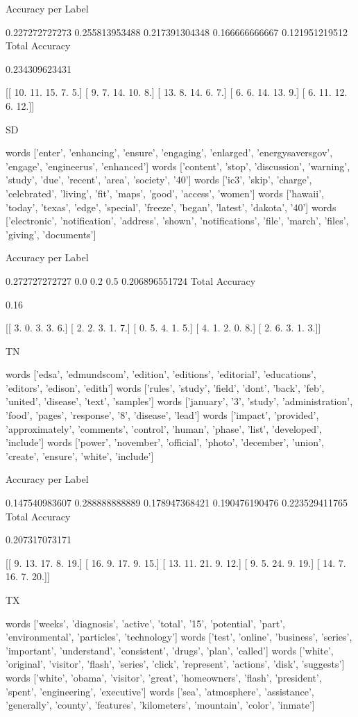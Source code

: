 \documentclass[11pt]{article}
\begin{document}
\begin{verbatium}
Accuracy per Label

0.227272727273
0.255813953488
0.217391304348
0.166666666667
0.121951219512
Total Accuracy

0.234309623431


[[ 10.  11.  15.   7.   5.]
 [  9.   7.  14.  10.   8.]
 [ 13.   8.  14.   6.   7.]
 [  6.   6.  14.  13.   9.]
 [  6.  11.  12.   6.  12.]]


SD


words
['enter', 'enhancing', 'ensure', 'engaging', 'enlarged', 'energysaversgov', 'engage', 'engineerus', 'enhanced']
words
['content', 'stop', 'discussion', 'warning', 'study', 'due', 'recent', 'area', 'society', '40']
words
['ic3', 'skip', 'charge', 'celebrated', 'living', 'fit', 'maps', 'good', 'access', 'women']
words
['hawaii', 'today', 'texas', 'edge', 'special', 'freeze', 'began', 'latest', 'dakota', '40']
words
['electronic', 'notification', 'address', 'shown', 'notifications', 'file', 'march', 'files', 'giving', 'documents']

Accuracy per Label

0.272727272727
0.0
0.2
0.5
0.206896551724
Total Accuracy

0.16


[[ 3.  0.  3.  3.  6.]
 [ 2.  2.  3.  1.  7.]
 [ 0.  5.  4.  1.  5.]
 [ 4.  1.  2.  0.  8.]
 [ 2.  6.  3.  1.  3.]]


TN


words
['edsa', 'edmundscom', 'edition', 'editions', 'editorial', 'educations', 'editors', 'edison', 'edith']
words
['rules', 'study', 'field', 'dont', 'back', 'feb', 'united', 'disease', 'text', 'samples']
words
['january', '3', 'study', 'administration', 'food', 'pages', 'response', '8', 'disease', 'lead']
words
['impact', 'provided', 'approximately', 'comments', 'control', 'human', 'phase', 'list', 'developed', 'include']
words
['power', 'november', 'official', 'photo', 'december', 'union', 'create', 'ensure', 'white', 'include']

Accuracy per Label

0.147540983607
0.288888888889
0.178947368421
0.190476190476
0.223529411765
Total Accuracy

0.207317073171


[[  9.  13.  17.   8.  19.]
 [ 16.   9.  17.   9.  15.]
 [ 13.  11.  21.   9.  12.]
 [  9.   5.  24.   9.  19.]
 [ 14.   7.  16.   7.  20.]]


TX


words
['weeks', 'diagnosis', 'active', 'total', '15', 'potential', 'part', 'environmental', 'particles', 'technology']
words
['test', 'online', 'business', 'series', 'important', 'understand', 'consistent', 'drugs', 'plan', 'called']
words
['white', 'original', 'visitor', 'flash', 'series', 'click', 'represent', 'actions', 'disk', 'suggests']
words
['white', 'obama', 'visitor', 'great', 'homeowners', 'flash', 'president', 'spent', 'engineering', 'executive']
words
['sea', 'atmosphere', 'assistance', 'generally', 'county', 'features', 'kilometers', 'mountain', 'color', 'inmate']


\end{verbatium}
\end{document}
